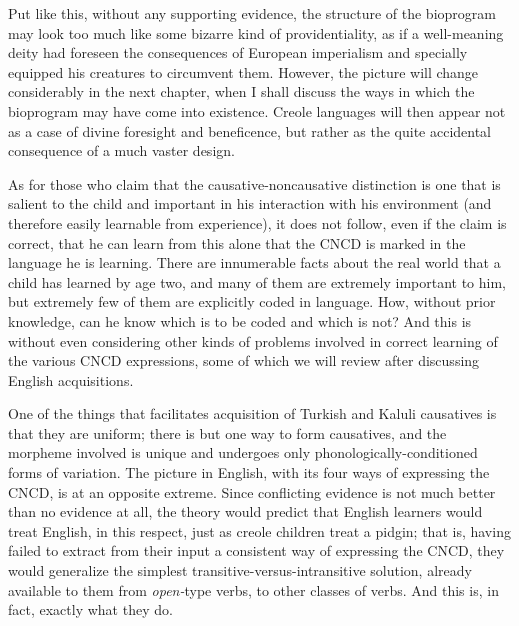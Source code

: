 Put like this, without any supporting evidence, the structure of the bioprogram may look too much like some bizarre kind of providentiality, as if a well-meaning deity had foreseen the consequences of European imperialism and specially equipped his creatures to circum\-vent them. However, the picture will change considerably in the next chapter, when I shall discuss the ways in which the bioprogram may have come into existence. Creole languages will then appear not as a case of divine foresight and beneficence, but rather as the quite acci\-dental consequence of a much vaster design.

As for those who claim that the causative-noncausative distinc\-tion is one that is salient to the child and important in his interaction with his environment (and therefore easily learnable from experience), it does not follow, even if the claim is correct, that he can learn from this alone that the CNCD is marked in the language he is learning. There are innumerable facts about the real world that a child has learned by age two, and many of them are extremely important to him, but extremely few of them are explicitly coded in language. How, without prior knowledge, can he know which is to be coded and which is not? And this is without even considering other kinds of problems involved in correct learning of the various CNCD expressions, some of which we will review after discussing English acquisitions.

One of the things that facilitates acquisition of Turkish and Kaluli causatives is that they are uniform; there is but one way to form causatives, and the morpheme involved is unique and undergoes only phonologically-conditioned forms of variation. The picture in English, with its four ways of expressing the CNCD, is at an opposite extreme. Since conflicting evidence is not much better than no evidence at all, the theory would predict that English learners would treat English, in this respect, just as creole children treat a pidgin; that is, having failed to extract from their input a consistent way of expressing the CNCD, they would generalize the simplest transitive-versus-intransitive solution, already available to them from \textit{open-}type verbs, to other classes of verbs. And this is, in fact, exactly what they do.

